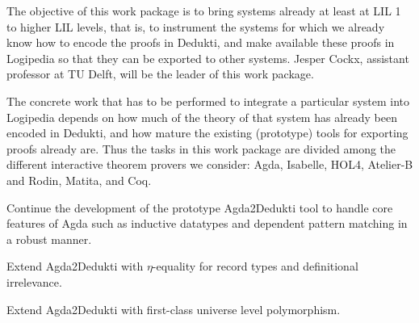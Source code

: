 \begin{workpackage}[id=instrumentation,type=RTD,wphases=1-48,
  short=Integration,%
  title=Integration,
  lead=Del,
  DelRM=14,
  GotRM=4,
  TumRM=5,
  ChaRM=16,
  CleRM=14,
  ImtRM=1,
  TouRM=11,
  BolRM=16, %
  InrRM=6]

\begin{wpobjectives}
  The objective of this work package is to bring systems already at least at
  LIL 1 to higher LIL levels, that is, to instrument the systems
  for which we already know how to encode the proofs in Dedukti, and
  make available these proofs in Logipedia so that
  they can be exported to other systems.
  Jesper Cockx, assistant professor at TU Delft, will be the leader of
  this work package.
\end{wpobjectives}

\begin{wpdescription}
  The concrete work that has to be performed to integrate a particular
  system into Logipedia depends on how much of the theory of that
  system has already been encoded in Dedukti, and how mature the
  existing (prototype) tools for exporting proofs already are. Thus
  the tasks in this work package are divided among the different
  interactive theorem provers we consider: Agda, Isabelle, HOL4,
  Atelier-B and Rodin, Matita, and Coq.
\end{wpdescription}

\begin{tasklist}
\begin{task}[id=agda,
  title=Instrument Agda,
  shorttitle=Agda,
  lead=Del,
  DelRM=14,
  GotRM=4,
  wphases=1-18]
% 
\vspace{-5mm}
\begin{compactitem}
\item Continue the development of the prototype Agda2Dedukti tool to
handle core features of Agda such as inductive datatypes and dependent
pattern matching in a robust manner.
\item Extend Agda2Dedukti with $\eta$-equality for record types and definitional irrelevance.
\item Extend Agda2Dedukti with first-class universe level polymorphism.
\end{compactitem}
\end{task}


\end{tasklist}
\end{workpackage}
